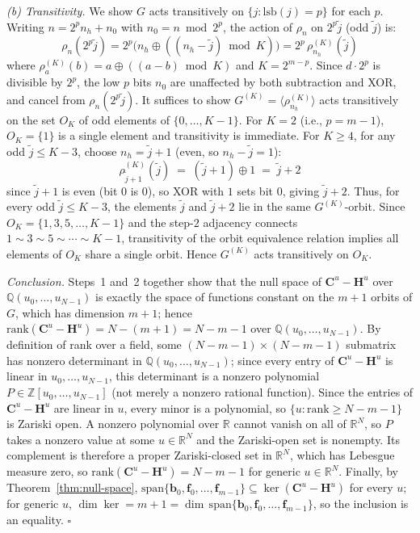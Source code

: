 \documentclass[10pt,a4paper]{amsart}
\begin{document}
\smallskip
\emph{(b) Transitivity.} We show $G$ acts transitively on $\{j : \mathrm{lsb}(j) = p\}$ for each $p$. Writing $n = 2^p n_h + n_0$ with $n_0 = n\bmod 2^p$, the action of $\rho_n$ on $2^p\tilde{j}$ (odd $\tilde{j}$) is:
\[
\rho_n(2^p \tilde{j}) = 2^p\bigl(n_h \oplus ((n_h - \tilde{j})\bmod K)\bigr) = 2^p\,\rho^{(K)}_{n_h}(\tilde{j})
\]
where $\rho^{(K)}_a(b) = a\oplus((a-b)\bmod K)$ and $K = 2^{m-p}$. Since $d\cdot 2^p$ is divisible by $2^p$, the low $p$ bits $n_0$ are unaffected by both subtraction and XOR, and cancel from $\rho_n(2^p\tilde{j})$. It suffices to show $G^{(K)} = \langle\rho^{(K)}_{n_h}\rangle$ acts transitively on the set $O_K$ of odd elements of $\{0,\ldots,K-1\}$. For $K=2$ (i.e., $p=m-1$), $O_K = \{1\}$ is a single element and transitivity is immediate. For $K \geq 4$, for any odd $\tilde{j} \leq K-3$, choose $n_h = \tilde{j}+1$ (even, so $n_h - \tilde{j} = 1$):
\[
\rho^{(K)}_{\tilde{j}+1}(\tilde{j}) \;=\; (\tilde{j}+1)\oplus 1 \;=\; \tilde{j}+2
\]
since $\tilde{j}+1$ is even (bit 0 is $0$), so XOR with $1$ sets bit 0, giving $\tilde{j}+2$. Thus, for every odd $\tilde{j} \leq K-3$, the elements $\tilde{j}$ and $\tilde{j}+2$ lie in the same $G^{(K)}$-orbit. Since $O_K = \{1,3,5,\ldots,K-1\}$ and the step-$2$ adjacency connects $1\sim 3\sim 5\sim\cdots\sim K-1$, transitivity of the orbit equivalence relation implies all elements of $O_K$ share a single orbit. Hence $G^{(K)}$ acts transitively on $O_K$.

\medskip
\noindent\textit{Conclusion.} Steps~1 and~2 together show that the null space of $\mathbf{C}^u-\mathbf{H}^u$ over $\mathbb{Q}(u_0,\ldots,u_{N-1})$ is exactly the space of functions constant on the $m+1$ orbits of $G$, which has dimension $m+1$; hence $\mathrm{rank}(\mathbf{C}^u-\mathbf{H}^u) = N-(m+1) = N-m-1$ over $\mathbb{Q}(u_0,\ldots,u_{N-1})$. By definition of rank over a field, some $(N-m-1)\times(N-m-1)$ submatrix has nonzero determinant in $\mathbb{Q}(u_0,\ldots,u_{N-1})$; since every entry of $\mathbf{C}^u-\mathbf{H}^u$ is linear in $u_0,\ldots,u_{N-1}$, this determinant is a nonzero polynomial $P\in\mathbb{Z}[u_0,\ldots,u_{N-1}]$ (not merely a nonzero rational function). Since the entries of $\mathbf{C}^u-\mathbf{H}^u$ are linear in $u$, every minor is a polynomial, so $\{u:\mathrm{rank}\geq N-m-1\}$ is Zariski open. A nonzero polynomial over $\mathbb{R}$ cannot vanish on all of $\mathbb{R}^N$, so $P$ takes a nonzero value at some $u\in\mathbb{R}^N$ and the Zariski-open set is nonempty. Its complement is therefore a proper Zariski-closed set in $\mathbb{R}^N$, which has Lebesgue measure zero, so $\mathrm{rank}(\mathbf{C}^u-\mathbf{H}^u) = N-m-1$ for generic $u\in\mathbb{R}^N$. Finally, by Theorem~\ref{thm:null-space}, $\mathrm{span}\{\mathbf{b}_0, \mathbf{f}_0, \ldots, \mathbf{f}_{m-1}\} \subseteq \ker(\mathbf{C}^u - \mathbf{H}^u)$ for every $u$; for generic $u$, $\dim\ker = m+1 = \dim\,\mathrm{span}\{\mathbf{b}_0, \mathbf{f}_0, \ldots, \mathbf{f}_{m-1}\}$, so the inclusion is an equality. $\square$
\end{document}

